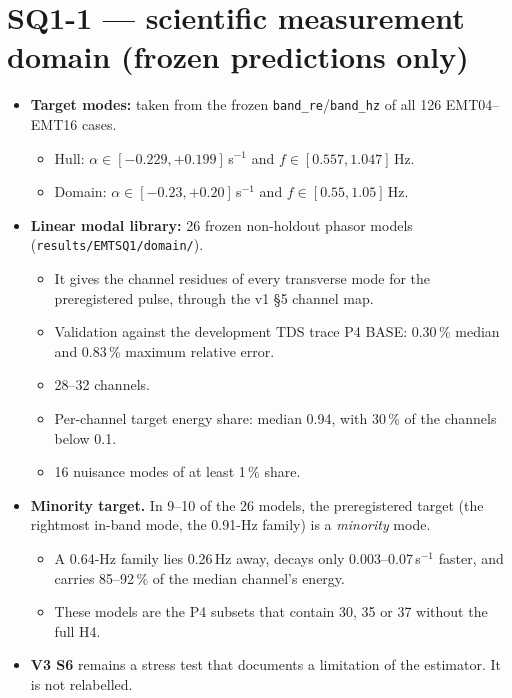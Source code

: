 \documentclass[10pt,a4paper]{article}
\newcommand{\sinv}{\,s$^{-1}$}
\newcommand{\f}[1]{\nolinkurl{#1}}
\begin{document}
\section{SQ1-1 --- scientific measurement domain (frozen predictions only)}
\begin{itemize}
\item \textbf{Target modes:} taken from the frozen \texttt{band\_re}/\texttt{band\_hz} of all 126 EMT04--EMT16 cases.
\begin{itemize}
\item Hull: $\alpha\in[-0.229,+0.199]$\sinv{} and $f\in[0.557,1.047]$\,Hz.
\item Domain: $\alpha\in[-0.23,+0.20]$\sinv{} and $f\in[0.55,1.05]$\,Hz.
\end{itemize}
\item \textbf{Linear modal library:} 26 frozen non-holdout phasor models (\f{results/EMTSQ1/domain/}).
\begin{itemize}
\item It gives the channel residues of every transverse mode for the preregistered pulse, through the v1 \S5 channel map.
\item Validation against the development TDS trace P4 BASE: 0.30\,\% median and 0.83\,\% maximum relative error.
\item 28--32 channels.
\item Per-channel target energy share: median 0.94, with 30\,\% of the channels below 0.1.
\item 16 nuisance modes of at least 1\,\% share.
\end{itemize}
\item \textbf{Minority target.} In 9--10 of the 26 models, the preregistered target (the rightmost in-band mode, the 0.91-Hz family) is a \emph{minority} mode.
\begin{itemize}
\item A 0.64-Hz family lies 0.26\,Hz away, decays only 0.003--0.07\sinv{} faster, and carries 85--92\,\% of the median channel's energy.
\item These models are the P4 subsets that contain 30, 35 or 37 without the full H4.
\end{itemize}
\item \textbf{V3 S6} remains a stress test that documents a limitation of the estimator. It is not relabelled.
\end{itemize}
\end{document}
